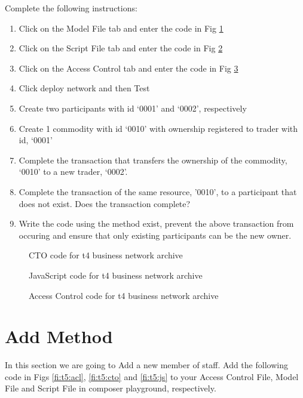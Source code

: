 Complete the following instructions:
\begin{enumerate}
	\item Click on the Model File tab and enter the code in Fig \ref{fi:t4:cto} 
	\item Click on the Script File tab and enter the code in Fig \ref{fi:t4:js}
	\item Click on the Access Control tab and enter the code in Fig \ref{fi:t4:acl}
	\item Click deploy network and then Test
	\item Create two participants with id `0001' and `0002', respectively
	\item Create 1 commodity with id `0010' with ownership registered to trader with id, `0001'
	\item Complete the transaction that transfers the ownership of the commodity, `0010' to a new trader, `0002'. 
	\item Complete the transaction of the same resource, '0010', to a participant that does not exist. Does the transaction complete?
	\item Write the code using the method exist, prevent the above transaction from occuring and ensure that only existing participants can be the new owner.
\end{enumerate}

\begin{figure}
	
	\caption{CTO code for t4 business network archive}
	\label{fi:t4:cto}
\end{figure}

\begin{figure}
	
	\caption{JavaScript code for t4 business network archive}
	\label{fi:t4:js}
\end{figure}


\begin{figure}
	
	\caption{Access Control code for t4 business network archive}
	\label{fi:t4:acl}
\end{figure}


\section{Add Method}

In this section we are going to Add a new member of staff. Add the following code in Figs \ref{fi:t5:acl}, \ref{fi:t5:cto} and \ref{fi:t5:js} to your Access Control File, Model File and Script File in composer playground, respectively.

